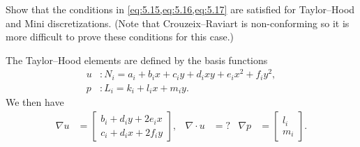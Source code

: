 \begin{exercise}{5.2}
    Show that the conditions in \cref{eq:5.15,eq:5.16,eq:5.17} are satisfied for Taylor--Hood and Mini discretizations. %
    (Note that Crouzeix--Raviart is non-conforming so it is more difficult to prove these conditions for this case.) %
\end{exercise}

\begin{solution}{5.2}
    The Taylor--Hood elements are defined by the basis functions %
    \begin{equation}
        \begin{split}
            u &: N_i = a_i + b_i x + c_i y + d_i x y + e_i x^2 + f_i y^2, \\
            p &: L_i = k_i + l_i x + m_i y.
        \end{split}
    \end{equation}
    We then have
    \begin{align*}
        \nabla u &=
        \begin{bmatrix}
            b_i + d_i y + 2 e_i x \\
            c_i + d_i x + 2 f_i y
        \end{bmatrix},
        &
        \nabla \cdot u &= ?
        &
        \nabla p &=
        \begin{bmatrix}
            l_i \\
            m_i
        \end{bmatrix}.
    \end{align*}

\end{solution}